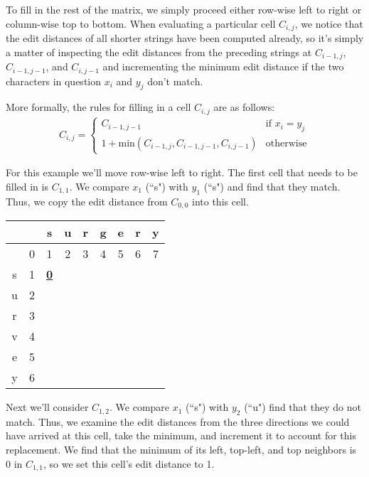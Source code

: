 \documentclass[10pt]{article}
\begin{document}
To fill in the rest of the matrix, we simply proceed either row-wise left to
right or column-wise top to bottom. When evaluating a particular cell $C_{i, j}$,
we notice that the edit distances of all shorter strings have been computed
already, so it's simply a matter of inspecting the edit distances from the
preceding strings at $C_{i - 1, j}$, $C_{i - 1, j - 1}$, and $C_{i, j - 1}$ and
incrementing the minimum edit distance if the two characters in question $x_{i}$
and $y_{j}$ don't match.

More formally, the rules for filling in a cell $C_{i, j}$ are as follows:
\begin{align*}
C_{i, j} = \begin{cases}
C_{i - 1, j - 1} & \text{if } x_{i} = y_{j} \\
1 + \text{min}(C_{i - 1, j}, C_{i - 1, j - 1}, C_{i, j - 1}) & \text{otherwise}
\end{cases}
\end{align*}

For this example we'll move row-wise left to right. The first cell that needs
to be filled in is $C_{1, 1}$. We compare $x_{1}$ (``s") with $y_{1}$ (``s") and
find that they match. Thus, we copy the edit distance from $C_{0, 0}$ into this
cell.

\begin{center}
\begin{tabular}{c|c|c|c|c|c|c|c|c|}
  &   & s & u & r & g & e & r & y \\ \hline
  & 0 & 1 & 2 & 3 & 4 & 5 & 6 & 7 \\ \hline
s & 1 & \textbf{\underline{0}} &   &   &   &   &   &   \\ \hline
u & 2 &   &   &   &   &   &   &   \\ \hline
r & 3 &   &   &   &   &   &   &   \\ \hline
v & 4 &   &   &   &   &   &   &   \\ \hline
e & 5 &   &   &   &   &   &   &   \\ \hline
y & 6 &   &   &   &   &   &   &   \\ \hline
\end{tabular}
\end{center}

Next we'll consider $C_{1, 2}$. We compare $x_{1}$ (``s") with $y_{2}$ (``u")
find that they do not match. Thus, we examine the edit distances from the three
directions we could have arrived at this cell, take the minimum, and increment
it to account for this replacement. We find that the minimum of its left,
top-left, and top neighbors is 0 in $C_{1, 1}$, so we set this cell's edit
distance to 1.
\end{document}
